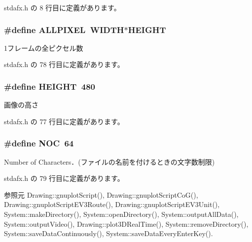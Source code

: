  stdafx.\-h の 8 行目に定義があります。

\subsubsection[{A\-L\-L\-P\-I\-X\-E\-L}]{\setlength{\rightskip}{0pt plus 5cm}\#define A\-L\-L\-P\-I\-X\-E\-L~{\bf W\-I\-D\-T\-H}$\ast${\bf H\-E\-I\-G\-H\-T}}\label{stdafx_8h_ada27e1c35871e9e6118bd9818362f01e}


1フレームの全ピクセル数 



 stdafx.\-h の 78 行目に定義があります。

\subsubsection[{H\-E\-I\-G\-H\-T}]{\setlength{\rightskip}{0pt plus 5cm}\#define H\-E\-I\-G\-H\-T~480}\label{stdafx_8h_aed89bd71aee8be823e8a20ec4e093c1e}


画像の高さ 



 stdafx.\-h の 77 行目に定義があります。

\subsubsection[{N\-O\-C}]{\setlength{\rightskip}{0pt plus 5cm}\#define N\-O\-C~64}\label{stdafx_8h_a5d8ba032e2fdf7b2561f508164124f3e}


Number of Characters．(ファイルの名前を付けるときの文字数制限) 



 stdafx.\-h の 79 行目に定義があります。



参照元 Drawing\-::gnuplot\-Script(), Drawing\-::gnuplot\-Script\-Co\-G(), Drawing\-::gnuplot\-Script\-E\-V3\-Route(), Drawing\-::gnuplot\-Script\-E\-V3\-Unit(), System\-::make\-Directory(), System\-::open\-Directory(), System\-::output\-All\-Data(), System\-::output\-Video(), Drawing\-::plot3\-D\-Real\-Time(), System\-::remove\-Directory(), System\-::save\-Data\-Continuously(), System\-::save\-Data\-Every\-Enter\-Key().

